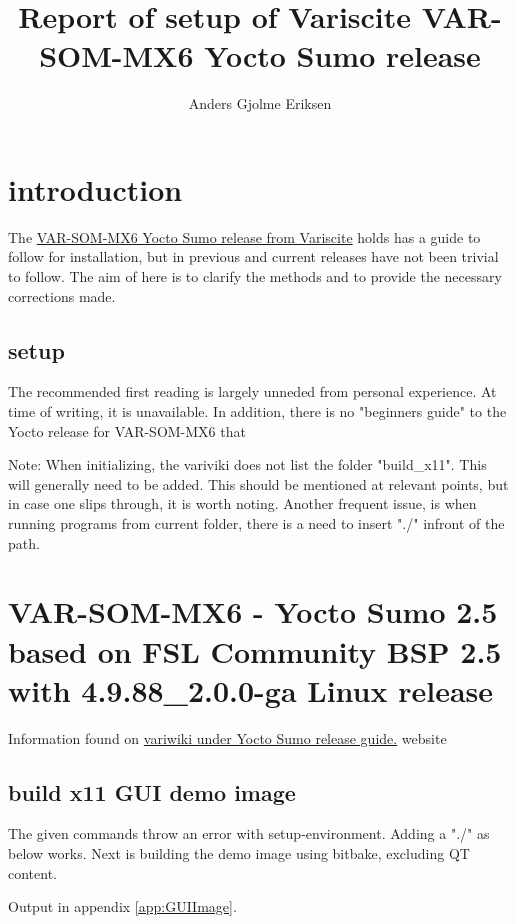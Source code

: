 \documentclass[10pt]{article}
\begin{document}
\title{%
    Report of setup of Variscite
    \large
    VAR-SOM-MX6 Yocto Sumo release
    }

\author{Anders Gjolme Eriksen}

\section{introduction}

    The \href{http://variwiki.com/index.php?title=VAR-SOM-MX6\_Yocto\&release=RELEASE\_SUMO\_V1.1\_VAR-SOM-MX6}{VAR-SOM-MX6 Yocto Sumo release from Variscite}
    holds has a guide to follow for installation, but in previous and current releases have not been trivial to follow. The aim of here is to clarify the
    methods and to provide the necessary corrections made.

\subsection{setup}

    The recommended first reading is largely unneded from personal experience. At time of writing, it is unavailable. In addition, there is no "beginners guide"
    to the Yocto release for VAR-SOM-MX6 that

    Note: When initializing, the variviki does not list the folder "build\_x11". This will generally need to be added. This should be mentioned at relevant points, but
    in case one slips through, it is worth noting. Another frequent issue, is when running programs from current folder, there is a need to insert "./" infront of the
    path.


\section{VAR-SOM-MX6 - Yocto Sumo 2.5 based on FSL Community BSP 2.5 with 4.9.88\_2.0.0-ga Linux release}
Information found on \href{http://variwiki.com/index.php?title=Yocto\_Build\_Release&release=RELEASE\_SUMO\_V1.1\_VAR-SOM-MX6}{variwiki under Yocto Sumo release guide.}
website

\subsection{ build x11 GUI demo image}
The given commands throw an error with setup-environment. Adding a "./" as below works. Next is building the demo image using bitbake, excluding QT content.

Output in appendix \ref{app:GUIImage}.
\end{document}
